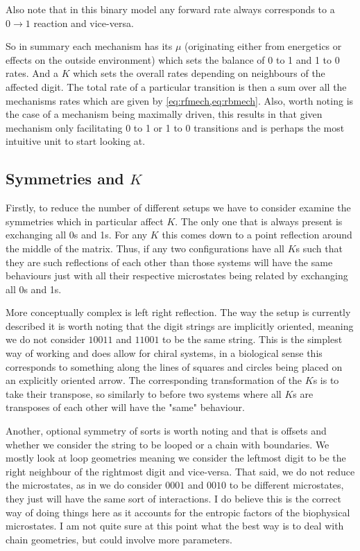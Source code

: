 \documentclass[11pt]{article}
\begin{document}
Also note that in this binary model any forward rate always corresponds to a $0\rightarrow1$ reaction and vice-versa.
\begin{tcolorbox}
	So in summary each mechanism has its $\mu$ (originating either from energetics or effects on the outside environment) which sets the balance of 0 to 1 and 1 to 0 rates.
	And a $K$ which sets the overall rates depending on neighbours of the affected digit.
	The total rate of a particular transition is then a sum over all the mechanisms rates which are given by \cref{eq:rfmech,eq:rbmech}.
    Also, worth noting is the case of a mechanism being maximally driven, this results in that given mechanism only facilitating 0 to 1 or 1 to 0 transitions and is perhaps the most intuitive unit to start looking at.
\end{tcolorbox}

\subsection{Symmetries and $K$}
Firstly, to reduce the number of different setups we have to consider examine the symmetries which in particular affect $K$.
The only one that is always present is exchanging all 0s and 1s.
For any $K$ this comes down to a point reflection around the middle of the matrix.
Thus, if any two configurations have all $K$s such that they are such reflections of each other than those systems will have the same behaviours just with all their respective microstates being related by exchanging all 0s and 1s.

More conceptually complex is left right reflection.
The way the setup is currently described it is worth noting that the digit strings are implicitly oriented, meaning we do not consider $10011$ and $11001$ to be the same string.
This is the simplest way of working and does allow for chiral systems, in a biological sense this corresponds to something along the lines of squares and circles being placed on an explicitly oriented arrow.
The corresponding transformation of the $K$s is to take their transpose, so similarly to before two systems where all $K$s are transposes of each other will have the "same" behaviour.

Another, optional symmetry of sorts is worth noting and that is offsets and whether we consider the string to be looped or a chain with boundaries.
We mostly look at loop geometries meaning we consider the leftmost digit to be the right neighbour of the rightmost digit and vice-versa.
That said, we do not reduce the microstates, as in we do consider $0001$ and $0010$ to be different microstates, they just will have the same sort of interactions.
I do believe this is the correct way of doing things here as it accounts for the entropic factors of the biophysical microstates.
I am not quite sure at this point what the best way is to deal with chain geometries, but could involve more parameters.
\end{document}
